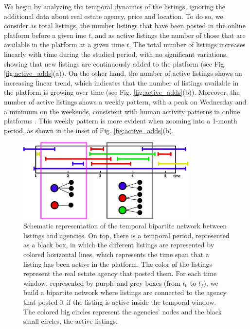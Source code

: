 We begin by analyzing the temporal dynamics of the listings, ignoring the additional data about real estate agency, price and location. To do so, we consider as total listings, the number listings that have been posted in the online platform before a given ime $t$, and as active listings the number of those that are available in the platform at a given time $t$. The total number of listings increases linearly with time during the studied period, with no significant variations, showing that new listings are continuously added to the platform (see Fig. \ref{fig:active_adds}(a)). On the other hand, the number of active listings shows an increasing linear trend, which indicates that the number of listings available in the platform is growing over time (see Fig. \ref{fig:active_adds}(b)). Moreover, the number of active listings shows a weekly pattern, with a peak on Wednesday and a minimum on the weekends, consistent with human activity patterns in online platforms \cite{goncalves-2008}. This weekly pattern is more evident when zooming into a 1-month period, as shown in the inset of Fig. \ref{fig:active_adds}(b).

\begin{figure}
    \vspace{0.2 cm}
    \centering
    \includegraphics[width = 0.8\textwidth]{Figs/Idealista_dynamics/temporal_bipartite.pdf}
	\caption[Housing market as a temporal bipartite network.]{Schematic representation of the temporal bipartite network between listings and agencies. On top, there is a temporal period, represented as a black box, in which the different listings are represented by colored horizontal lines, which represents the time span that a listing has been active in the platform. The color of the listings represent the real estate agency that posted them. For each time window, represented by purple and grey boxes (from $t_0$ to $t_f$), we build a bipartite network where listings are connected to the agency that posted it if the listing is active inside the temporal window. The colored big circles represent the agencies' nodes and the black small circles, the active listings. \label{fig:temporal_bipartite}}
\end{figure}

